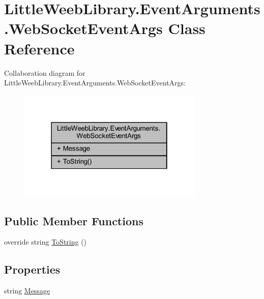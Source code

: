 \hypertarget{class_little_weeb_library_1_1_event_arguments_1_1_web_socket_event_args}{}\section{Little\+Weeb\+Library.\+Event\+Arguments.\+Web\+Socket\+Event\+Args Class Reference}
\label{class_little_weeb_library_1_1_event_arguments_1_1_web_socket_event_args}


Collaboration diagram for Little\+Weeb\+Library.\+Event\+Arguments.\+Web\+Socket\+Event\+Args\+:\nopagebreak
\begin{figure}[H]
\begin{center}
\leavevmode
\includegraphics[width=250pt]{class_little_weeb_library_1_1_event_arguments_1_1_web_socket_event_args__coll__graph}
\end{center}
\end{figure}
\subsection*{Public Member Functions}
\begin{DoxyCompactItemize}
\item 
override string \mbox{\hyperlink{class_little_weeb_library_1_1_event_arguments_1_1_web_socket_event_args_acf402c2f7fd4ddbf175fea7f921ea879}{To\+String}} ()
\end{DoxyCompactItemize}
\subsection*{Properties}
\begin{DoxyCompactItemize}
\item 
string \mbox{\hyperlink{class_little_weeb_library_1_1_event_arguments_1_1_web_socket_event_args_ac7aee4603c5f55b11dd59de007b3a8b3}{Message}}
\end{DoxyCompactItemize}


